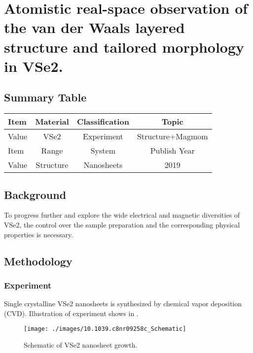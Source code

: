 \setchapterpreamble[u]{\margintoc}
\chapter{Atomistic real-space observation of the van der Waals layered structure and tailored morphology in VSe2.\cite{C8NR09258C}}

\section{Summary Table}

\begin{table}[h]
    \begin{tabular}{lccc}
    \hline
    Item  & Material         & Classification & Topic        \\  \hline
    Value & VSe2             & Experiment     & Structure+Magmom    \\  \hline
    Item  & Range            & System         & Publish Year \\  \hline
    Value & Structure        & Nanosheets     & 2019         \\  \hline
    \end{tabular}
\end{table}

\section{Background}
To progress further and explore the wide electrical and magnetic diversities of VSe2, the control over the sample preparation and the corresponding physical properties is necessary.

\section{Methodology}

\subsection{Experiment}
Single crystalline VSe2 nanosheets is synthesized by chemical vapor deposition (CVD). Illustration of experiment shows in .

\begin{figure}[ht] 
    \texttt{[image: ./images/10.1039.c8nr09258c\_Schematic]}
	\caption[Schematic of VSe2 nanosheet growth]{
		Schematic of VSe2 nanosheet growth.
	}
\end{figure}

